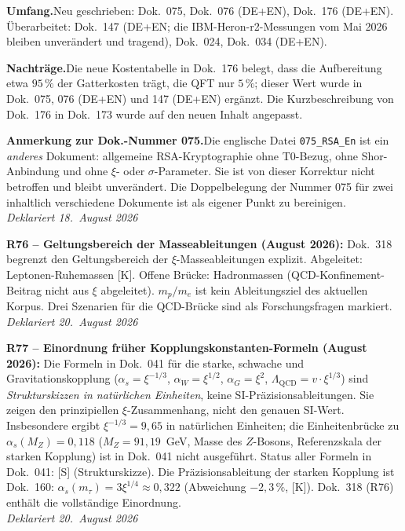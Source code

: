 \smallskip\noindent\textbf{Umfang.}\quad Neu geschrieben: Dok.~075, Dok.~076
(DE+EN), Dok.~176 (DE+EN). \"Uberarbeitet: Dok.~147 (DE+EN; die
IBM-Heron-r2-Messungen vom Mai 2026 bleiben unver\"andert und tragend),
Dok.~024, Dok.~034 (DE+EN).

\smallskip\noindent\textbf{Nachträge.}\quad Die neue Kostentabelle in Dok.~176 belegt, dass die Aufbereitung etwa $95\,\%$ der Gatterkosten trägt, die QFT nur $5\,\%$; dieser Wert wurde in Dok.~075, 076 (DE+EN) und 147 (DE+EN) ergänzt. Die Kurzbeschreibung von Dok.~176 in Dok.~173 wurde auf den neuen Inhalt angepasst.

\smallskip\noindent\textbf{Anmerkung zur Dok.-Nummer 075.}\quad Die
englische Datei \texttt{075\_RSA\_En} ist ein \emph{anderes} Dokument:
allgemeine RSA-Kryptographie ohne T0-Bezug, ohne Shor-Anbindung und ohne
$\xi$- oder $\sigma$-Parameter. Sie ist von dieser Korrektur nicht
betroffen und bleibt unver\"andert. Die Doppelbelegung der Nummer 075 f\"ur
zwei inhaltlich verschiedene Dokumente ist als eigener Punkt zu
bereinigen.\\
\emph{Deklariert 18.~August 2026}

\medskip
\textbf{R76 -- Geltungsbereich der Masseableitungen (August 2026):} Dok.~318 begrenzt den Geltungsbereich der $\xi$-Masseableitungen explizit. Abgeleitet: Leptonen-Ruhemassen [K]. Offene Brücke: Hadronmassen (QCD-Konfinement-Beitrag nicht aus $\xi$ abgeleitet). $m_p/m_e$ ist kein Ableitungsziel des aktuellen Korpus. Drei Szenarien für die QCD-Brücke sind als Forschungsfragen markiert.\\
\emph{Deklariert 20.~August 2026}

\medskip

\medskip
\textbf{R77 -- Einordnung früher Kopplungskonstanten-Formeln (August 2026):} Die Formeln in Dok.~041 für die starke, schwache und Gravitationskopplung ($\alpha_s = \xi^{-1/3}$, $\alpha_W = \xi^{1/2}$, $\alpha_G = \xi^2$, $\Lambda_{\mathrm{QCD}} = v\cdot\xi^{1/3}$) sind \emph{Strukturskizzen in natürlichen Einheiten}, keine SI-Präzisionsableitungen. Sie zeigen den prinzipiellen $\xi$-Zusammenhang, nicht den genauen SI-Wert. Insbesondere ergibt $\xi^{-1/3} = 9{,}65$ in natürlichen Einheiten; die Einheitenbrücke zu $\alpha_s(M_Z) = 0{,}118$ ($M_Z = 91{,}19$~GeV, Masse des $Z$-Bosons, Referenzskala der starken Kopplung) ist in Dok.~041 nicht ausgeführt. Status aller Formeln in Dok.~041: [S] (Strukturskizze). Die Präzisionsableitung der starken Kopplung ist Dok.~160: $\alpha_s(m_\tau) = 3\xi^{1/4} \approx 0{,}322$ (Abweichung $-2{,}3\,\%$, [K]). Dok.~318 (R76) enthält die vollständige Einordnung.\\
\emph{Deklariert 20.~August 2026}


